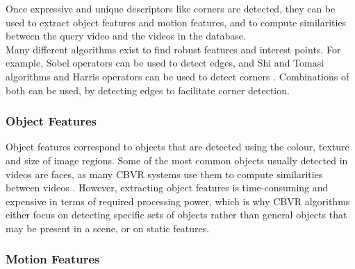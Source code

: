 Once expressive and unique descriptors like corners are detected, they can be used to extract object features and motion features, and to compute similarities between the query video and the videos in the database.\\

Many different algorithms exist to find robust features and interest points. For example, Sobel operators can be used to detect edges, and Shi and Tomasi algorithms and Harris operators can be used to detect corners \cite{bradski2008opencv}. Combinations of both can be used, by detecting edges to facilitate corner detection.

\subsubsection{Object Features}

Object features correspond to objects that are detected using the colour, texture and size of image regions. Some of the most common objects usually detected in videos are faces, as many CBVR systems use them to compute similarities between videos \cite{sivic2005face}. However, extracting object features is time-consuming and expensive in terms of required processing power, which is why CBVR algorithms either focus on detecting specific sets of objects rather than general objects that may be present in a scene, or on static features.

\subsubsection{Motion Features}

